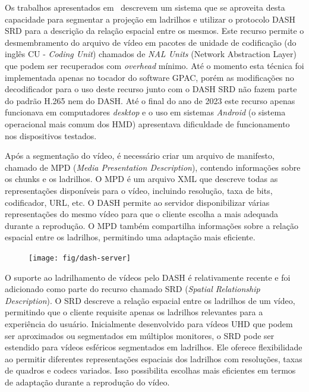Os trabalhos apresentados em~\cite{Concolato2017, LeFeuvre2016} descrevem um sistema que se aproveita desta capacidade para segmentar a projeção em ladrilhos e utilizar o protocolo DASH SRD para a descrição da relação espacial entre os mesmos. Este recurso permite o desmembramento do arquivo de vídeo em pacotes de unidade de codificação (do inglês CU - \textit{Coding Unit}) chamados de\textit{ NAL Units} (Network Abstraction Layer) que podem ser recuperados com \textit{overhead} mínimo. Até o momento esta técnica foi implementada apenas no tocador do software GPAC, porém as modificações no decodificador para o uso deste recurso junto com o DASH SRD não fazem parte do padrão H.265 nem do DASH. Até o final do ano de 2023 este recurso apenas funcionava em computadores \textit{desktop} e o uso em sistemas \textit{Android} (o sistema operacional mais comum dos HMD) apresentava dificuldade de funcionamento nos dispositivos testados.

Após a segmentação do vídeo, é necessário criar um arquivo de manifesto, chamado de MPD (\textit{Media Presentation Description}), contendo informações sobre os chunks e os ladrilhos. O MPD é um arquivo XML que descreve todas as representações disponíveis para o vídeo, incluindo resolução, taxa de bits, codificador, URL, etc. O DASH permite ao servidor disponibilizar várias representações do mesmo vídeo para que o cliente escolha a mais adequada durante a reprodução. O MPD também compartilha informações sobre a relação espacial entre os ladrilhos, permitindo uma adaptação mais eficiente.

\begin{figure}[h]
    \centering
    \texttt{[image: fig/dash-server]}
    \caption{}
    \label{fig:dash-server}
\end{figure}

O suporte ao ladrilhamento de vídeos pelo DASH é relativamente recente e foi adicionado como parte do recurso chamado SRD (\textit{Spatial Relationship Description}). O SRD descreve a relação espacial entre os ladrilhos de um vídeo, permitindo que o cliente requisite apenas os ladrilhos relevantes para a experiência do usuário. Inicialmente desenvolvido para vídeos UHD que podem ser aproximados ou segmentados em múltiplos monitores, o SRD pode ser estendido para vídeos esféricos segmentados em ladrilhos. Ele oferece flexibilidade ao permitir diferentes representações espaciais dos ladrilhos com resoluções, taxas de quadros e codecs variados. Isso possibilita escolhas mais eficientes em termos de adaptação durante a reprodução do vídeo.

